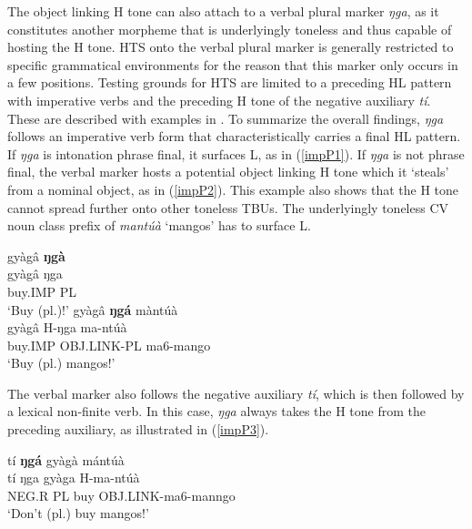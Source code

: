 The object linking H tone can also attach to a verbal plural marker {\itshape ŋga}, as it constitutes another morpheme that is underlyingly toneless and thus capable of hosting the H tone.
HTS onto the verbal plural marker is generally restricted to specific grammatical environments for the reason that this marker only occurs in a few positions. Testing grounds for HTS are limited to a preceding HL pattern with imperative verbs and the preceding H tone of the negative auxiliary {\itshape tí}.  These are described with examples in . To summarize the overall findings, {\itshape ŋga} follows an  imperative verb form that characteristically carries a final HL pattern. If {\itshape ŋga} is intonation phrase final, it surfaces L, as in (\ref{impP1}). If {\itshape ŋga} is not phrase final, the verbal marker hosts a potential object linking H tone which it  `steals' from a nominal object, as in (\ref{impP2}). This example also shows that the H tone cannot spread further onto other toneless TBUs. The underlyingly toneless CV noun class prefix of {\itshape mantúà} `mangos' has to surface L.


\begin{exe}
\ex\label{impP}
\begin{xlist}
\ex \label{impP1}
  \glll gyàgâ {\bfseries ŋgà} \\
         gyàgâ ŋga \\
         buy.IMP PL\\
    \trans `Buy (pl.)!' 
\ex\label{impP2}
  \glll gyàgâ {\bfseries ŋgá} màntúà \\
         gyàgâ H-ŋga ma-ntúà \\
         buy.IMP OBJ.LINK-PL ma6-mango\\
    \trans `Buy (pl.) mangos!' 
\end{xlist}
\end{exe}


The verbal marker also follows the negative auxiliary {\itshape tí}, which is then followed by a lexical non-finite verb. In this case, {\itshape ŋga} always takes the H tone from the preceding auxiliary, as illustrated in (\ref{impP3}). 

\begin{exe}
\ex\label{impP3}
  \glll tí {\bfseries ŋgá} gyàgà mántúà \\
         tí ŋga gyàga H-ma-ntúà \\
         NEG.R PL buy OBJ.LINK-ma6-manngo\\
    \trans `Don't (pl.) buy mangos!' 
\end{exe}


